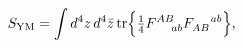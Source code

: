 \begin{equation}
\label{2.2}
S_{\rm YM} = \int d^4z \, d^4\bar{z}\, {\rm tr} \Bigr\{
\hbox{$\frac{1}{4}$} F^{AB}_{\!~~~~ab} F_{AB}^{\!~~~~ab} \Bigr\},
\end{equation}

